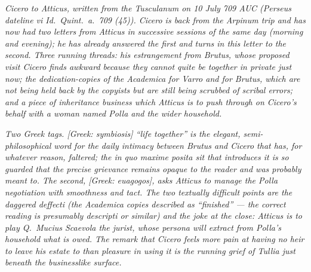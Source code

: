 
\textit{Cicero to Atticus, written from the Tusculanum
on 10 July 709 AUC (Perseus dateline \textit{vi Id.\
Quint.\ a.\ 709 (45)}). Cicero is back from the
Arpinum trip and has now had two letters from Atticus
in successive sessions of the same day (morning and
evening); he has already answered the first and turns
in this letter to the second. Three running threads:
his estrangement from Brutus, whose proposed visit
Cicero finds awkward because they cannot quite be
together in private just now; the dedication-copies
of the \textit{Academica} for Varro and for Brutus,
which are not being held back by the copyists but are
still being scrubbed of scribal errors; and a piece
of inheritance business which Atticus is to push
through on Cicero's behalf with a woman named Polla
and the wider household.}

\textit{Two Greek tags. \textit{[Greek: symbiosis]}
``life together'' is the elegant, semi-philosophical
word for the daily intimacy between Brutus and Cicero
that has, for whatever reason, faltered; the
\textit{in quo maxime posita sit} that introduces it
is so guarded that the precise grievance remains
opaque to the reader and was probably meant to. The
second, \textit{[Greek: euagogos]}, asks Atticus to
manage the Polla negotiation with smoothness and
tact. The two textually difficult points are the
daggered \textit{deffecti} (the \textit{Academica}
copies described as ``\dag{}finished\dag{}'' --- the
correct reading is presumably \textit{descripti} or
similar) and the joke at the close: Atticus is to play
Q.~Mucius Scaevola the jurist, whose persona will
extract from Polla's household what is owed. The
remark that Cicero feels more pain at having no
heir to leave his estate to than pleasure in using
it is the running grief of Tullia just beneath the
businesslike surface.}
